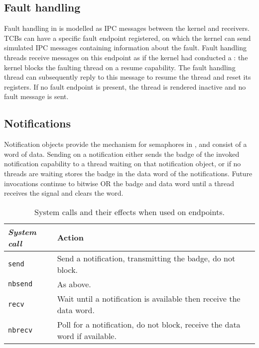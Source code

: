 \subsection{Fault handling}

Fault handling in \selfour is modelled as IPC messages between the kernel and receivers. 
\glspl{TCB} can have a specific fault endpoint registered, on which the kernel can send simulated
\gls{IPC} messages containing information about the fault. Fault handling threads receive messages
on this endpoint as if the kernel had conducted a : the kernel blocks the faulting
thread on a resume capability.  The fault handling thread can subsequently reply to this message to
resume the thread and reset its
registers. If no fault endpoint is present, the
thread is rendered inactive and no fault message is sent. 

\subsection{Notifications}
\label{p:sel4_notifications}

Notification objects provide the mechanism for semaphores in \selfour, and consist of a word of
data. Sending on a notification either sends the badge of the invoked notification capability to a 
thread waiting on that notification object, or if no threads are waiting stores the badge in the
data word of the notifications. Future invocations continue to bitwise OR the badge and data word
until a thread receives the signal and clears the word. 

\begin{table} 
    \centering
    \begin{tabular}{p{}p{}}\toprule
        \emph{System call} & Action \\\midrule
        \texttt{send}   & Send a notification, transmitting the badge, do not block. \\ 
        \texttt{nbsend} & As above. \\
        \texttt{recv}   & Wait until a notification is available then receive the data word.  \\
        \texttt{nbrecv} & Poll for a notification, do not block, receive the data word if available. \\
        \bottomrule
    \end{tabular}
    \caption{System calls and their effects when used on endpoints.}
    \label{t:notification-system-calls}
\end{table}

